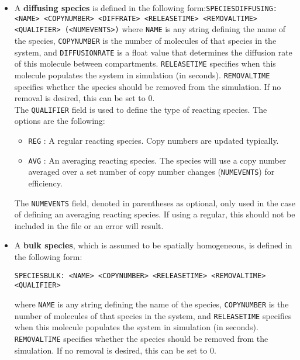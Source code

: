 \documentclass[11pt, oneside]{article}   	%
\begin{document}
\begin{itemize}
\item 
A \textbf{diffusing species} is defined in the following form:\newline\newline \texttt{SPECIESDIFFUSING: <NAME> <COPYNUMBER> <DIFFRATE> <RELEASETIME> <REMOVALTIME> <QUALIFIER> (<NUMEVENTS>)} \newline\newline where \texttt{NAME} is any string defining the name of the species, \texttt{COPYNUMBER} is the number of molecules of that species in the system, and \texttt{DIFFUSIONRATE} is a float value that determines the diffusion rate of this molecule between compartments. \texttt{RELEASETIME} specifies when this molecule populates the system in simulation (in seconds). \texttt{REMOVALTIME} specifies whether the species should be removed from the simulation. If no removal is desired, this can be set to 0.\\

The \texttt{QUALIFIER} field is used to define the type of reacting species. The options are the following:
\begin{itemize}
\item \texttt{REG} : A regular reacting species. Copy numbers are updated typically.
\item \texttt{AVG} : An averaging reacting species. The species will use a copy number averaged over a set number of copy number changes (\texttt{NUMEVENTS}) for efficiency.
\end{itemize}
The \texttt{NUMEVENTS} field, denoted in parentheses as optional, only used in the case of defining an averaging reacting species. If using a regular, this should not be included in the file or an error will result.

\item
A \textbf{bulk species}, which is assumed to be spatially homogeneous, is defined in the following form:\newline\newline\centerline{\texttt{SPECIESBULK: <NAME> <COPYNUMBER> <RELEASETIME> <REMOVALTIME> <QUALIFIER>}}\newline\newline where \texttt{NAME} is any string defining the name of the species, \texttt{COPYNUMBER} is the number of molecules of that species in the system, and \texttt{RELEASETIME} specifies when this molecule populates the system in simulation (in seconds). \texttt{REMOVALTIME} specifies whether the species should be removed from the simulation. If no removal is desired, this can be set to 0.


\end{itemize}
\end{document}
